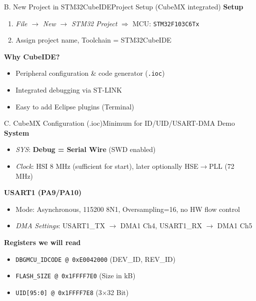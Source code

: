\documentclass{beamer}
\begin{document}
\begin{frame}{B. New Project in STM32CubeIDE}{Project Setup (CubeMX integrated)}
	\textbf{Setup}
	\begin{enumerate}
		\item \textit{File $\rightarrow$ New $\rightarrow$ STM32 Project} $\Rightarrow$ MCU: \texttt{STM32F103C6Tx}
		\item Assign project name, Toolchain = STM32CubeIDE
	\end{enumerate}
	
	\medskip
	\textbf{Why CubeIDE?}
	\begin{itemize}
		\item Peripheral configuration \& code generator (\texttt{.ioc})
		\item Integrated debugging via ST-LINK
		\item Easy to add Eclipse plugins (Terminal)
	\end{itemize}
\end{frame}

\begin{frame}{C. CubeMX Configuration (.ioc)}{Minimum for ID/UID/USART-DMA Demo}
	\textbf{System}
	\begin{itemize}
		\item \textit{SYS}: \textbf{Debug = Serial Wire} (SWD enabled)
		\item \textit{Clock}: HSI 8 MHz (sufficient for start), later optionally HSE$\rightarrow$PLL (72 MHz)
	\end{itemize}
	
	\medskip
	\textbf{USART1 (PA9/PA10)}
	\begin{itemize}
		\item Mode: Asynchronous, 115200 8N1, Oversampling=16, no HW flow control
		\item \textit{DMA Settings}: USART1\_TX $\rightarrow$ DMA1 Ch4, USART1\_RX $\rightarrow$ DMA1 Ch5
	\end{itemize}
	
	\medskip
	\textbf{Registers we will read}
	\begin{itemize}
		\item \texttt{DBGMCU\_IDCODE @ 0xE0042000} (DEV\_ID, REV\_ID)
		\item \texttt{FLASH\_SIZE @ 0x1FFFF7E0} (Size in kB)
		\item \texttt{UID[95:0] @ 0x1FFFF7E8} (3$\times$32 Bit)
	\end{itemize}
\end{frame}
\end{document}

